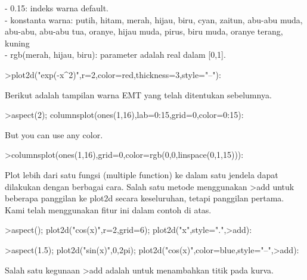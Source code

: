 \documentclass{article}
\begin{document}
\begin{eulernotebook}
\begin{eulercomment}
\begin{eulercomment}
\begin{eulercomment}
\begin{eulercomment}
\begin{eulercomment}
- 0.15: indeks warna default.\\
- konstanta warna: putih, hitam, merah, hijau, biru, cyan, zaitun,
abu-abu muda, abu-abu, abu-abu tua, oranye, hijau muda, pirus, biru
muda, oranye terang, kuning\\
- rgb(merah, hijau, biru): parameter adalah real dalam [0,1].
\end{eulercomment}
\begin{eulerprompt}
>plot2d("exp(-x^2)",r=2,color=red,thickness=3,style="--"):
\end{eulerprompt}
\begin{eulercomment}
Berikut adalah tampilan warna EMT yang telah ditentukan sebelumnya.
\end{eulercomment}
\begin{eulerprompt}
>aspect(2); columnsplot(ones(1,16),lab=0:15,grid=0,color=0:15):
\end{eulerprompt}
\begin{eulercomment}
But you can use any color.
\end{eulercomment}
\begin{eulerprompt}
>columnsplot(ones(1,16),grid=0,color=rgb(0,0,linspace(0,1,15))):
\end{eulerprompt}
\begin{eulercomment}
Plot lebih dari satu fungsi (multiple function) ke dalam satu jendela
dapat dilakukan dengan berbagai cara. Salah satu metode menggunakan
\textgreater{}add untuk beberapa panggilan ke plot2d secara keseluruhan, tetapi
panggilan pertama. Kami telah menggunakan fitur ini dalam contoh di
atas.
\end{eulercomment}
\begin{eulerprompt}
>aspect(); plot2d("cos(x)",r=2,grid=6); plot2d("x",style=".",>add):
\end{eulerprompt}
\begin{eulerprompt}
>aspect(1.5); plot2d("sin(x)",0,2pi); plot2d("cos(x)",color=blue,style="--",>add):
\end{eulerprompt}
\begin{eulercomment}
Salah satu kegunaan \textgreater{}add adalah untuk menambahkan titik pada kurva.
\end{eulercomment}

\end{eulercomment}
\end{eulercomment}
\end{eulercomment}
\end{eulercomment}
\end{eulernotebook}
\end{document}
